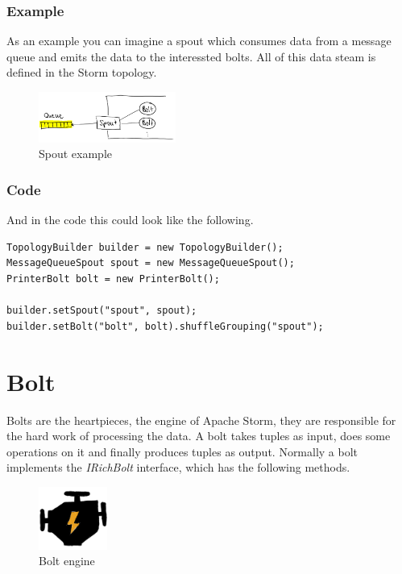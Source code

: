 \subsubsection{Example}
As an example you can imagine a spout which consumes data from a message queue and emits the data
to the interessted bolts. All of this data steam is defined in the Storm topology.

\begin{figure}[H]
\centering
\captionsetup{justification=centering}
\includegraphics[width=0.4\textwidth]{images/spout_example.png}
\caption[Spout example]{Spout example}
\end{figure}

\subsubsection{Code}
And in the code this could look like the following.
\begin{lstlisting}
TopologyBuilder builder = new TopologyBuilder();
MessageQueueSpout spout = new MessageQueueSpout();
PrinterBolt bolt = new PrinterBolt();

builder.setSpout("spout", spout);
builder.setBolt("bolt", bolt).shuffleGrouping("spout");
\end{lstlisting}


\newpage

\section{Bolt}
Bolts are the heartpieces, the engine of Apache Storm, they are responsible for the hard work of processing the data.
A bolt takes tuples as input, does some operations on it and finally produces tuples as output.
Normally a bolt implements the \textit{IRichBolt} interface, which has the following methods.

\begin{figure}[H]
\centering
\captionsetup{justification=centering}
\includegraphics[width=0.2\textwidth]{images/engine.png}
\caption[Bolt engine]{Bolt engine}
\end{figure}


